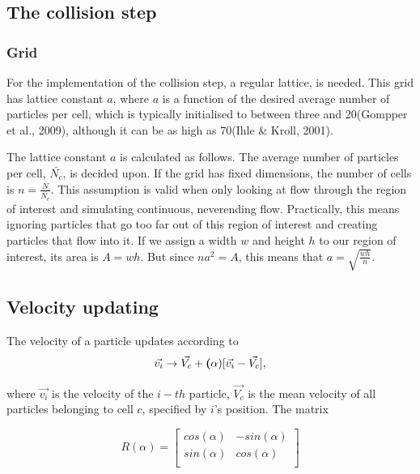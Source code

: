 \documentclass[
]{article}
\begin{document}
\hypertarget{the-collision-step-1}{%
\subsection{The collision step}\label{the-collision-step-1}}

\hypertarget{grid}{%
\subsubsection{Grid}\label{grid}}

For the implementation of the collision step, a regular lattice, is
needed. This grid has lattice constant \(a\), where \(a\) is a function
of the desired average number of particles per cell, which is typically
initialised to between three and 20(Gompper et al., 2009), although it
can be as high as 70(Ihle \& Kroll, 2001).

The lattice constant \(a\) is calculated as follows. The average number
of particles per cell, \(\bar{N_c}\), is decided upon. If the grid has
fixed dimensions, the number of cells is \(n = \frac{N}{\bar{N_c}}\).
This assumption is valid when only looking at flow through the region of
interest and simulating continuous, neverending flow. Practically, this
means ignoring particles that go too far out of this region of interest
and creating particles that flow into it. If we assign a width \(w\) and
height \(h\) to our region of interest, its area is \(A = wh\). But
since \(n a^{2} = A\), this means that \(a = \sqrt{\frac{wh}{n}}\).

\hypertarget{velocity-updating}{%
\subsection{Velocity updating}\label{velocity-updating}}

The velocity of a particle updates according to \begin{equation}
\vec{v_{i}} \rightarrow \vec{V_c} + \textbf(\alpha)[\vec{v_i} - \vec{V_c}],
\end{equation}

where \(\vec{v_{i}}\) is the velocity of the \(i-th\) particle,
\(\vec{V_c}\) is the mean velocity of all particles belonging to cell
\(c\), specified by \(i\)'s position. The matrix

\[
R(\alpha) = 
\left[ \begin{array}{rr}
cos(\alpha) & -sin(\alpha) \\
sin(\alpha) & cos(\alpha) \\
\end{array}\right]
\]
\end{document}
